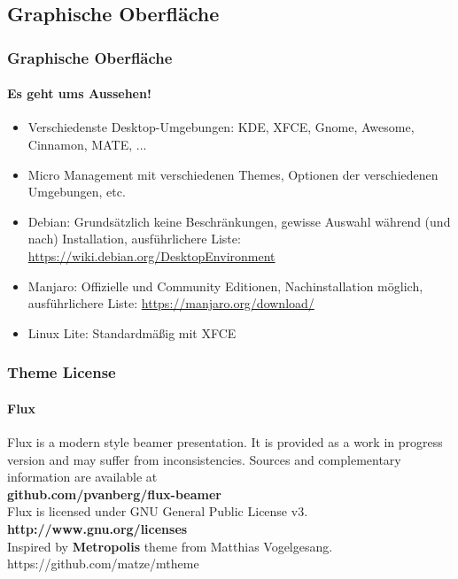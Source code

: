 \documentclass[9pt]{beamer}
\begin{document}
\subsection{Graphische Oberfläche}
\begin{frame}
 \frametitle{Graphische Oberfläche}
 \framesubtitle{Es geht ums Aussehen!}
 \begin{Large}
 \begin{itemize}
  \item Verschiedenste Desktop-Umgebungen: KDE, XFCE, Gnome, Awesome, Cinnamon, MATE, ...
  \item Micro Management mit verschiedenen Themes, Optionen der verschiedenen Umgebungen, etc.
  \item Debian: Grundsätzlich keine Beschränkungen, gewisse Auswahl während (und nach) Installation, ausführlichere Liste: \href{https://wiki.debian.org/DesktopEnvironment}{https://wiki.debian.org/DesktopEnvironment}
  \item Manjaro: Offizielle und Community Editionen, Nachinstallation möglich, ausführlichere Liste: \href{https://manjaro.org/download/}{https://manjaro.org/download/}
  \item Linux Lite: Standardmäßig mit XFCE
 \end{itemize}
 \end{Large}
\end{frame}


\begin{frame}
 \centering
 \frametitle{Theme License}
 \framesubtitle{Flux}
 	\justifying
 Flux is a modern style beamer presentation. It is provided as a work in progress version and may suffer from inconsistencies. Sources and complementary information are available at\\[0.3cm]
 	\centering\textbf{github.com/pvanberg/flux-beamer}\\
 Flux is licensed under GNU General Public License v3.\\[0.3cm]
 	\centering\textbf{http://www.gnu.org/licenses}\\[0.3cm]
Inspired by \textbf{Metropolis} theme from Matthias Vogelgesang.\\
https://github.com/matze/mtheme 
 
\end{frame}
\end{document}
